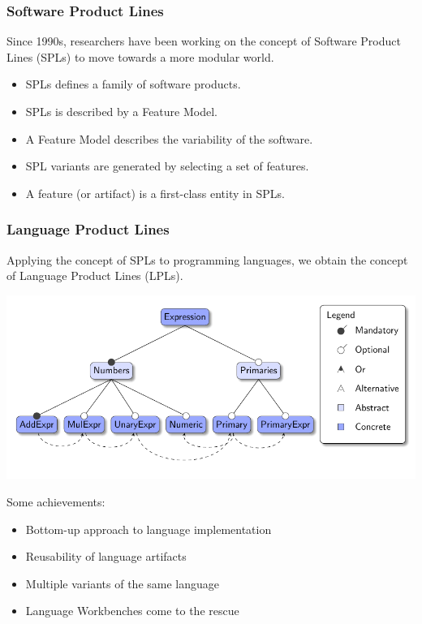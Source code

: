 \documentclass[9pt,xcolor=table,svgnames]{beamer}
\begin{document}
\begin{frame}%
    \frametitle{Software Product Lines}

    Since 1990s, researchers have been working on the concept of \alert{Software Product Lines} (SPLs) to move towards a more \alert{modular} world.

    \bigskip
    \pause

    \begin{itemize}
        \item SPLs defines a \alert{family} of software products.
        \item SPLs is described by a \alert{Feature Model}.
        \item A Feature Model describes the \alert{variability} of the software.
        \item SPL \alert{variants} are generated by selecting a set of features.
        \item A \alert{feature} (or \alert{artifact}) is a first-class entity in SPLs.
    \end{itemize}
\end{frame}

\begin{frame}%
    \frametitle{Language Product Lines}
    Applying the concept of SPLs to programming languages, we obtain the concept of \alert{Language Product Lines} (LPLs).

    \bigskip
    \includegraphics[width=1\textwidth]{figs/feature-model.pdf}

    \pause

    \huge Some achievements:
    \normalsize
    \begin{itemize}
        \item \alert{Bottom-up} approach to language implementation
        \item \alert{Reusability} of language artifacts
        \item Multiple \alert{variants} of the same language
        \item \alert{Language Workbenches} come to the rescue
    \end{itemize}
\end{frame}
\end{document}

